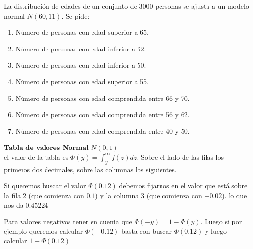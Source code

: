 La distribución de edades de un conjunto de 3000 personas se ajusta a un
modelo normal \(N(60,11)\). Se pide:

\begin{enumerate}
\def\labelenumi{\arabic{enumi}.}
\item
  Número de personas con edad superior a 65.
\item
  Número de personas con edad inferior a 62.
\item
  Número de personas con edad inferior a 50.
\item
  Número de personas con edad superior a 55.
\item
  Número de personas con edad comprendida entre 66 y 70.
\item
  Número de personas con edad comprendida entre 56 y 62.
\item
  Número de personas con edad comprendida entre 40 y 50.
\end{enumerate}

\textbf{Tabla de valores Normal \(N(0,1)\)}\\
el valor de la tabla es \(\Phi(y) = \int^{\infty}_{y} f(z)dz\). Sobre el
lado de las filas los primeros dos decimales, sobre las columnas los
siguientes.

Si queremos buscar el valor \(\Phi(0.12)\) debemos fijarnos en el valor
que está sobre la fila 2 (que comienza con \(0.1\)) y la columna 3 (que
comienza con \(+0.02\)), lo que nos da \(0.45224\)

Para valores negativos tener en cuenta que \(\Phi(-y) = 1-\Phi(y)\).
Luego si por ejemplo queremos calcular \(\Phi(-0.12)\) basta con buscar
\(\Phi(0.12)\) y luego calcular \(1-\Phi(0.12)\)\\

